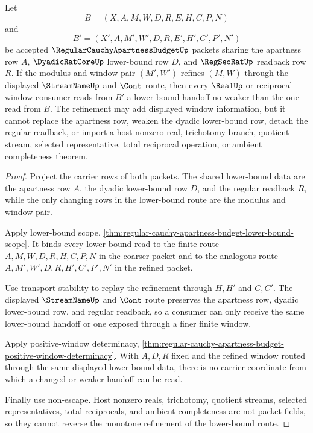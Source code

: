 \begin{theorem}
\label{thm:regular-cauchy-apartness-budget-lower-bound-modulus-monotonicity}
Let
$$
B=(X,A,M,W,D,R,E,H,C,P,N)
$$
and
$$
B'=(X',A,M',W',D,R,E',H',C',P',N')
$$
be accepted $\RegularCauchyApartnessBudgetUp$ packets sharing the apartness row $A$, $\DyadicRatCoreUp$ lower-bound row $D$, and $\RegSeqRatUp$ readback row $R$. If the modulus and window pair $(M',W')$ refines $(M,W)$ through the displayed $\StreamNameUp$ and $\Cont$ route, then every $\RealUp$ or reciprocal-window consumer reads from $B'$ a lower-bound handoff no weaker than the one read from $B$. The refinement may add displayed window information, but it cannot replace the apartness row, weaken the dyadic lower-bound row, detach the regular readback, or import a host nonzero real, trichotomy branch, quotient stream, selected representative, total reciprocal operation, or ambient completeness theorem.
\end{theorem}
\begin{proof}
Project the carrier rows of both packets. The shared lower-bound data are the apartness row $A$, the dyadic lower-bound row $D$, and the regular readback $R$, while the only changing rows in the lower-bound route are the modulus and window pair.

Apply lower-bound scope, \autoref{thm:regular-cauchy-apartness-budget-lower-bound-scope}. It binds every lower-bound read to the finite route $A,M,W,D,R,H,C,P,N$ in the coarser packet and to the analogous route $A,M',W',D,R,H',C',P',N'$ in the refined packet.

Use transport stability to replay the refinement through $H,H'$ and $C,C'$. The displayed $\StreamNameUp$ and $\Cont$ route preserves the apartness row, dyadic lower-bound row, and regular readback, so a consumer can only receive the same lower-bound handoff or one exposed through a finer finite window.

Apply positive-window determinacy, \autoref{thm:regular-cauchy-apartness-budget-positive-window-determinacy}. With $A,D,R$ fixed and the refined window routed through the same displayed lower-bound data, there is no carrier coordinate from which a changed or weaker handoff can be read.

Finally use non-escape. Host nonzero reals, trichotomy, quotient streams, selected representatives, total reciprocals, and ambient completeness are not packet fields, so they cannot reverse the monotone refinement of the lower-bound route.
\end{proof}

